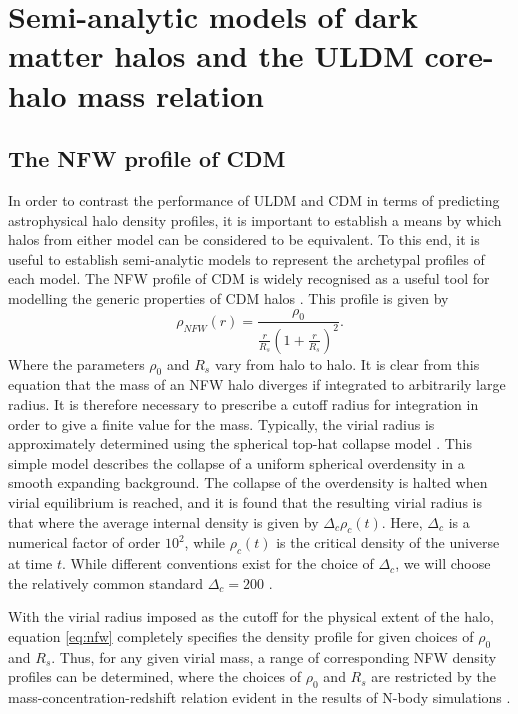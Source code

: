 \documentclass[a4paper,11pt]{article}
\begin{document}
\section{Semi-analytic models of dark matter halos and the ULDM core-halo mass relation}

\subsection{The NFW profile of CDM}

In order to contrast the performance of ULDM and CDM in terms of predicting astrophysical halo density profiles, it is important to establish a means by which halos from either model can be considered to be equivalent. To this end, it is useful to establish semi-analytic models to represent the archetypal profiles of each model. The NFW profile of CDM is widely recognised as a useful tool for modelling the generic properties of CDM halos \cite{Navarro:1995iw, Maccio:2008pcd}. This profile is given by
\begin{equation}\label{eq:nfw}
    \rho_{NFW}(r)=\frac{\rho_0}{\frac{r}{R_s}\left(1+\frac{r}{R_s}\right)^2}.
\end{equation}
Where the parameters $\rho_0$ and $R_s$ vary from halo to halo. It is clear from this equation that the mass of an NFW halo diverges if integrated to arbitrarily large radius. It is therefore necessary to prescribe a cutoff radius for integration in order to give a finite value for the mass. Typically, the virial radius is approximately determined using the spherical top-hat collapse model \cite{White:2000jv, Suto:2015jdt, Herrera:2017epn}. This simple model describes the collapse of a uniform spherical overdensity in a smooth expanding background. The collapse of the overdensity is halted when virial equilibrium is reached, and it is found that the resulting virial radius is that where the average internal density is given by $\Delta_c \rho_c(t)$. Here, $\Delta_c$ is a numerical factor of order $10^2$, while $\rho_c(t)$ is the critical density of the universe at time $t$. While different conventions exist for the choice of $\Delta_c$, we will choose the relatively common standard $\Delta_c = 200$ \cite{Richings:2018}. 

With the virial radius imposed as the cutoff for the physical extent of the halo, equation \ref{eq:nfw} completely specifies the density profile for given choices of $\rho_0$ and $R_s$. Thus, for any given virial mass, a range of corresponding NFW density profiles can be determined, where the choices of $\rho_0$ and $R_s$ are restricted by the mass-concentration-redshift relation evident in the results of N-body simulations \cite{Ludlow:2013vxa}. 
\end{document}
